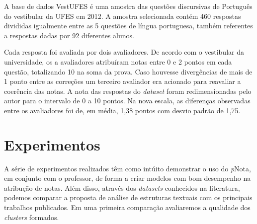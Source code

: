 A base de dados VestUFES \cite{pissinati2014} é uma amostra das questões discursivas de Português do vestibular da UFES em 2012. A amostra selecionada contém 460 respostas divididas igualmente entre as 5 questões de língua portuguesa, também referentes a respostas dadas por 92 diferentes alunos.

Cada resposta foi avaliada por dois avaliadores. De acordo com o vestibular da universidade, os a avaliadores atribuíram notas entre 0 e 2 pontos em cada questão, totalizando 10 na soma da prova. Caso houvesse divergências de mais de 1 ponto entre as correções um terceiro avaliador era acionado para reavaliar a coerência das notas. A nota das respostas do \textit{dataset} foram redimensionadas pelo autor para o intervalo de 0 a 10 pontos. Na nova escala, as diferenças observadas entre os avaliadores foi de, em média, 1,38 pontos com desvio padrão de 1,75.

\section{Experimentos}
\label{sec-experimentos}

A série de experimentos realizados têm como intúito demonstrar o uso do \textit{p}Nota, em conjunto com o professor, de forma a criar modelos com bom desempenho na atribução de notas. Além disso, através dos \textit{datasets} conhecidos na literatura, podemos comparar a proposta de análise de estruturas textuais com os principais trabalhos publicados. Em uma primeira comparação avaliaremos a qualidade dos \textit{clusters} formados.

